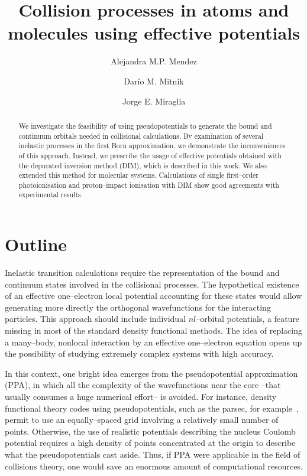 \documentclass[10pt]{article}
\begin{document}
\title{Collision processes in atoms and molecules using effective 
potentials}
\author[ ]{Alejandra M.P. Mendez}
\author[ ]{Dar\'io M. Mitnik}
\author[ ]{Jorge E. Miraglia}

\maketitle

\tableofcontents

\begin{abstract}
We investigate the feasibility of using pseudopotentials to generate
the bound and continuum orbitals needed in collisional calculations. 
By examination of several inelastic processes in the first Born 
approximation, we demonstrate the inconveniences of this approach. 
Instead, we prescribe the usage of effective potentials obtained with 
the depurated inversion method (DIM), which is described in this work. 
We also extended this method for molecular systems. Calculations of 
single first--order photoionisation and proton--impact ionisation with 
DIM show good agreements with experimental results.
\end{abstract}


\section{Outline}

Inelastic transition calculations require the representation of 
the bound and continuum states involved in the collisional processes. 
The hypothetical existence of an effective one--electron local 
potential accounting for these states would allow generating more 
directly the orthogonal wavefunctions for the interacting particles.
This approach should include individual $nl$--orbital potentials, a 
feature missing in most of the standard density functional methods. 
The idea of replacing a many--body, nonlocal interaction by an 
effective one--electron equation opens up the possibility of studying
extremely complex systems with high accuracy. 

In this context, one bright idea emerges from the pseudopotential
approximation (PPA), in which all the complexity of the wavefunctions near 
the core --that usually consumes a huge numerical effort-- is avoided.
For instance, density functional theory codes using pseudopotentials, 
such as the {\sc parsec}, for example~\cite{parsecwebpage,Chelikowsky1994}, 
permit to use an equally--spaced grid involving a relatively small 
number of points. 
Otherwise, the use of realistic potentials describing the nucleus 
Coulomb potential requires a high density of points concentrated at the 
origin to describe what the pseudopotentials cast aside. 
Thus, if PPA were applicable in the field of collisions theory, 
one would save an enormous amount of computational resources.
\end{document}
